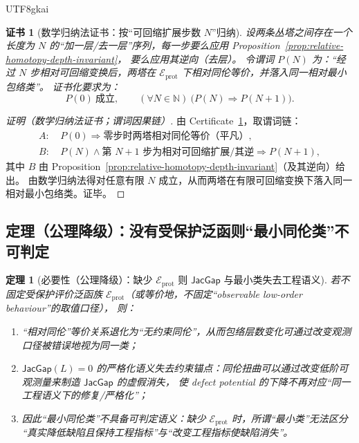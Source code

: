 \documentclass[12pt]{article}
\newtheorem{theorem}{定理}[section]
\newtheorem{certificate}{证书}[section]
\newcommand{\JacGap}{\ensuremath{\mathsf{JacGap}}}
\begin{document}
\begin{CJK*}{UTF8}{gkai}
\begin{certificate}[数学归纳法证书：按“可回缩扩展步数 $N$”归纳]
\label{cert:relative-minimal-envelope-induction}
设两条丛塔之间存在一个长度为 $N$ 的“加一层/去一层”序列，每一步要么应用 Proposition~\ref{prop:relative-homotopy-depth-invariant}，
要么应用其逆向（去层）。
令谓词 $P(N)$ 为：“经过 $N$ 步相对可回缩变换后，两塔在 $\mathcal{E}_{\mathrm{prot}}$ 下相对同伦等价，并落入同一相对最小包络类”。
证书化要求为：
\[
P(0)\ \text{成立},\qquad
(\forall N\in\mathbb{N})\ \bigl(P(N)\Rightarrow P(N+1)\bigr).
\]
\end{certificate}

\begin{proof}[证明（数学归纳法证书；谓词因果链）]
由 Certificate~\ref{cert:relative-minimal-envelope-induction}，取谓词链：
\[
\begin{aligned}
A:&\ P(0)\Rightarrow \text{零步时两塔相对同伦等价（平凡）},\\
B:&\ P(N)\wedge \text{第 $N{+}1$ 步为相对可回缩扩展/其逆}\Rightarrow P(N+1),
\end{aligned}
\]
其中 $B$ 由 Proposition~\ref{prop:relative-homotopy-depth-invariant}（及其逆向）给出。
由数学归纳法得对任意有限 $N$ 成立，从而两塔在有限可回缩变换下落入同一相对最小包络类。证毕。
\end{proof}

\subsection{定理（公理降级）：没有受保护泛函则“最小同伦类”不可判定}

\begin{theorem}[必要性（公理降级）：缺少 $\mathcal{E}_{\mathrm{prot}}$ 则 $\JacGap$ 与最小类失去工程语义]
\label{thm:protected-evaluations-necessary}
若不固定受保护评价泛函族 $\mathcal{E}_{\mathrm{prot}}$（或等价地，不固定“observable low-order behaviour”的取值口径），
则：
\begin{enumerate}
  \item “相对同伦”等价关系退化为“无约束同伦”，从而包络层数变化可通过改变观测口径被错误地视为同一类；
  \item $\JacGap(L)=0$ 的严格化语义失去约束锚点：同伦扭曲可以通过改变低阶可观测量来制造 $\JacGap$ 的虚假消失，
  使 defect potential 的下降不再对应“同一工程语义下的修复/严格化”；
  \item 因此“最小同伦类”不具备可判定语义：缺少 $\mathcal{E}_{\mathrm{prot}}$ 时，所谓“最小类”无法区分
  “真实降低缺陷且保持工程指标”与“改变工程指标使缺陷消失”。
\end{enumerate}
\end{theorem}


\end{CJK*}
\end{document}
